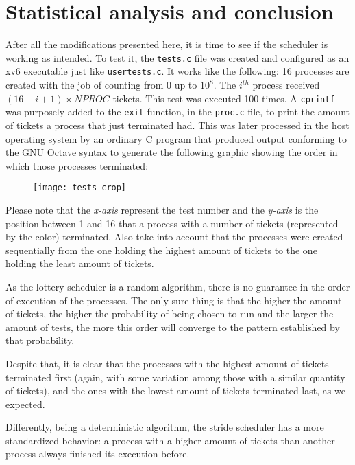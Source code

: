 \documentclass[12pt]{article}
\begin{document}
\section{Statistical analysis and conclusion}
After all the modifications presented here, it is time to see if the scheduler is working as intended. To test it, the \texttt{tests.c} file was created and configured as an xv6 executable just like \texttt{usertests.c}. It works like the following: 16 processes are created with the job of counting from 0 up to $10^8$. The $i^{th}$ process received $(16 - i + 1) \times NPROC$ tickets. This test was executed 100 times. A \texttt{cprintf} was purposely added to the \texttt{exit} function, in the \texttt{proc.c} file, to print the amount of tickets a process that just terminated had. This was later processed in the host operating system by an ordinary C program that produced output conforming to the GNU Octave syntax to generate the following graphic showing the order in which those processes terminated:

\begin{figure}[h]
\texttt{[image: tests-crop]}
\centering
\end{figure}

Please note that the \emph{x-axis} represent the test number and the \emph{y-axis} is the position between 1 and 16 that a process with a number of tickets (represented by the color) terminated. Also take into account that the processes were created sequentially from the one holding the highest amount of tickets to the one holding the least amount of tickets.

As the lottery scheduler is a random algorithm, there is no guarantee in the order of execution of the processes. The only sure thing is that the higher the amount of tickets, the higher the probability of being chosen to run and the larger the amount of tests, the more this order will converge to the pattern established by that probability.

Despite that, it is clear that the processes with the highest amount of tickets terminated first (again, with some variation among those with a similar quantity of tickets), and the ones with the lowest amount of tickets terminated last, as we expected.

Differently, being a deterministic algorithm, the stride scheduler has a more standardized behavior: a process with a higher amount of tickets than another process always finished its execution before.



\end{document}
